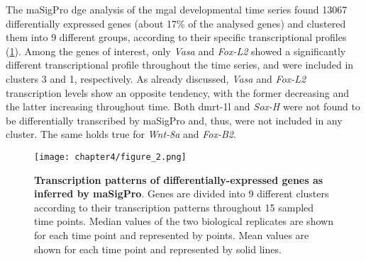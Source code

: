The maSigPro \gls{dge} analysis of the \gls{mgal} developmental time series found \num{13067} differentially expressed genes (about 17\% of the analysed genes) and clustered them into 9 different groups, according to their specific transcriptional profiles (\cref{fig:masigpro}). Among the genes of interest, only \textit{Vasa} and \textit{Fox-L2} showed a significantly different transcriptional profile throughout the time series, and were included in clusters 3 and 1, respectively. As already discussed, \textit{Vasa} and \textit{Fox-L2} transcription levels show an opposite tendency, with the former decreasing and the latter increasing throughout time. Both \gls{dmrt-1l} and \textit{Sox-H} were not found to be differentially transcribed by maSigPro and, thus, were not included in any cluster. The same holds true for \textit{Wnt-8a} and \textit{Fox-B2}.

\begin{figure}[t!]
	\centering
	\texttt{[image: chapter4/figure\_2.png]}
	\caption[\textbf{Transcription patterns of differentially-expressed genes as inferred by maSigPro}]
	{
		\textbf{Transcription patterns of differentially-expressed genes as inferred by maSigPro}. Genes are divided into 9 different clusters according to their transcription patterns throughout 15 sampled time points. Median values of the two biological replicates are shown for each time point and represented by points. Mean values are shown for each time point and represented by solid lines.
	}
	\label{fig:masigpro}
\end{figure}

